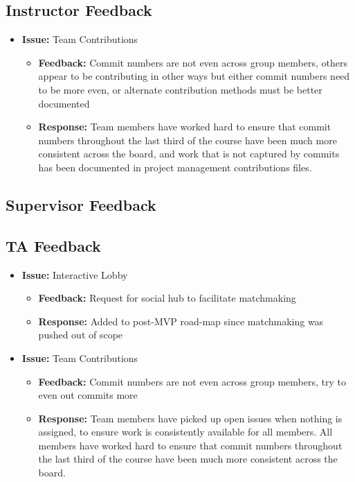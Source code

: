 \documentclass{article}
\begin{document}

\subsection{Instructor Feedback}

\begin{itemize}
    \item \textbf{Issue:} Team Contributions
    \begin{itemize}
        \item \textbf{Feedback:} Commit numbers are not even across group members, others appear to be contributing in other ways but either commit numbers need to be more even, or alternate contribution methods must be better documented
        \item \textbf{Response:} Team members have worked hard to ensure that commit numbers throughout the last third of the course have been much more consistent across the board, and work that is not captured by commits has been documented in project management contributions files. 
    \end{itemize}
\end{itemize}

\subsection{Supervisor Feedback}


\subsection{TA Feedback}

\begin{itemize}
    \item \textbf{Issue:} Interactive Lobby
    \begin{itemize}
        \item \textbf{Feedback:} Request for social hub to facilitate matchmaking
        \item \textbf{Response:} Added to post-MVP road-map since matchmaking was pushed out of scope
    \end{itemize}

    \item \textbf{Issue:} Team Contributions
    \begin{itemize}
        \item \textbf{Feedback:} Commit numbers are not even across group members, try to even out commits more
        \item \textbf{Response:} Team members have picked up open issues when nothing is assigned, to ensure work is consistently available for all members. All members have worked hard to ensure that commit numbers throughout the last third of the course have been much more consistent across the board. 
    \end{itemize}
\end{itemize}
\end{document}
